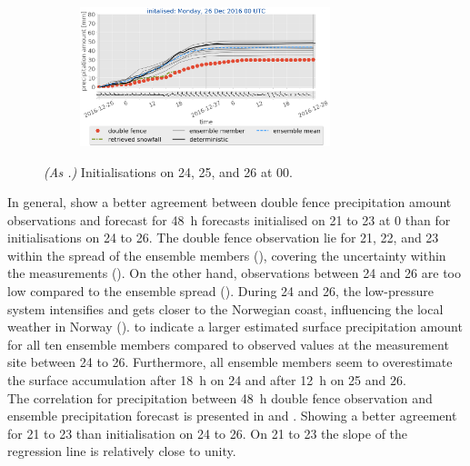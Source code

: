 \begin{figure}[H]
\begin{subfigure}[t]{0.97\textwidth}
		\caption{}\label{fig:sfc_acc26}
	\end{subfigure}
	\begin{subfigure}[t]{\textwidth}
		\centering
		\includegraphics[trim={1.2cm 0cm 1.1cm 21.4cm},clip,width=0.8\textwidth]{./fig_sfc_acc/acc_wind_20161226_00}
	\end{subfigure}
	\caption{\textit{(As .)} Initialisations on \num{24}, \num{25}, and \SI{26}{\dec} at \SI{00}{\UTC}. }\label{fig:sfc_acc:2426}
\end{figure}
\noindent
In general,  show a better agreement between double fence precipitation amount observations and forecast for \SI{48}{\hour} forecasts initialised on \num{21} to \SI{23}{\dec} at \SI{0}{\UTC} than for initialisations on \num{24} to \SI{26}{\dec}. 
The double fence observation lie for \num{21}, \num{22}, and \SI{23}{\dec} within the spread of the ensemble members (), covering the uncertainty within the measurements (). On the other hand, observations between \num{24} and \SI{26}{\dec} are too low  compared to the ensemble spread ().
During \num{24} and \SI{26}{\dec}, the low-pressure system intensifies and gets closer to the Norwegian coast, influencing the local weather in Norway ().  to  indicate a larger estimated surface precipitation amount for all ten ensemble members compared to observed values at the measurement site between \num{24} to \SI{26}{\dec}. Furthermore, all ensemble members seem to overestimate the surface accumulation after \SI{18}{\hour} on \SI{24}{\dec} and after \SI{12}{\hour} on \num{25} and \SI{26}{\dec}. 
\\
The correlation for precipitation between \SI{48}{\hour} double fence observation and ensemble precipitation forecast is presented in  and . Showing a better agreement for \num{21} to \SI{23}{\dec} than initialisation on \num{24} to \SI{26}{\dec}. On \num{21} to \SI{23}{\dec} the slope of the regression line is relatively close to unity. 
